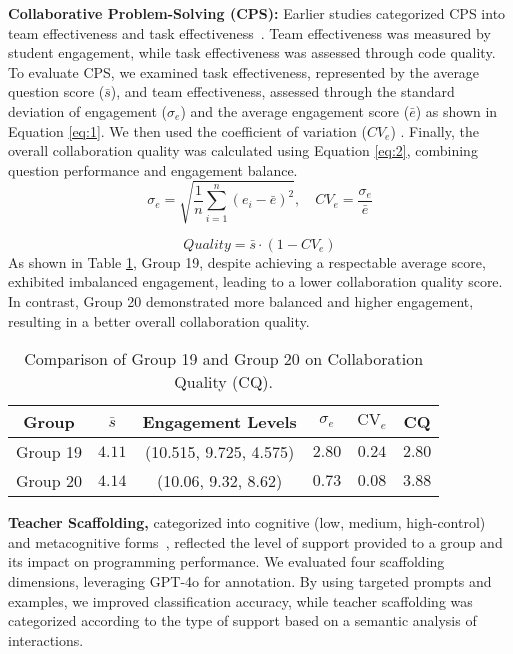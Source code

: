 \textbf{Collaborative Problem-Solving (CPS):} 
Earlier studies categorized CPS into team effectiveness and task effectiveness~\cite{rosen2020towards}. Team effectiveness was measured by student engagement, while task effectiveness was assessed through code quality. %
To evaluate CPS, we examined task effectiveness, represented by the average question score (\(\bar{s}\)), and team effectiveness, assessed through the standard deviation of engagement (\(\sigma_e\)) and the average engagement score (\(\bar{e}\)) as shown in Equation \ref{eq:1}. We then used the coefficient of variation (\(CV_e\)) . Finally, the overall collaboration quality was calculated using Equation \ref{eq:2}, combining question performance and engagement balance. 
\begin{equation}
\sigma_e = \sqrt{\frac{1}{n} \sum_{i=1}^{n} (e_i - \bar{e})^2}, \quad CV_e = \frac{\sigma_e}{\bar{e}}
\label{eq:1}
\end{equation}

\begin{equation}
Quality = \bar{s} \cdot (1 - CV_e)
\label{eq:2}
\end{equation}
As shown in Table \ref{table:comparison}, Group 19, despite achieving a respectable average score, exhibited imbalanced engagement, leading to a lower collaboration quality score. In contrast, Group 20 demonstrated more balanced and higher engagement, resulting in a better overall collaboration quality.
\begin{table}[htbp]
\centering
\begin{tabular}{cccccc}
\toprule
\textbf{Group} & \(\bar{s}\) & \textbf{Engagement Levels} & \(\sigma_e\) & \(\text{CV}_e\) & \textbf{CQ} \\
\midrule
Group 19 & \(4.11\) & (10.515, 9.725, 4.575) & \(2.80\) & \(0.24\) & \(2.80\) \\
Group 20 & \(4.14\) & (10.06, 9.32, 8.62) & \(0.73\) & \(0.08\) & \(3.88\) \\
\bottomrule
\end{tabular}
\caption{Comparison of Group 19 and Group 20 on Collaboration Quality (CQ).}
\label{table:comparison}
\end{table}

\textbf{Teacher Scaffolding,} categorized into cognitive (low, medium, high-control) and metacognitive forms~\cite{ouyang2022applying}, reflected the level of support provided to a group and its impact on programming performance. We evaluated four scaffolding dimensions, leveraging GPT-4o for annotation. By using targeted prompts and examples, we improved classification accuracy, while teacher scaffolding was categorized according to the type of support based on a semantic analysis of interactions.


